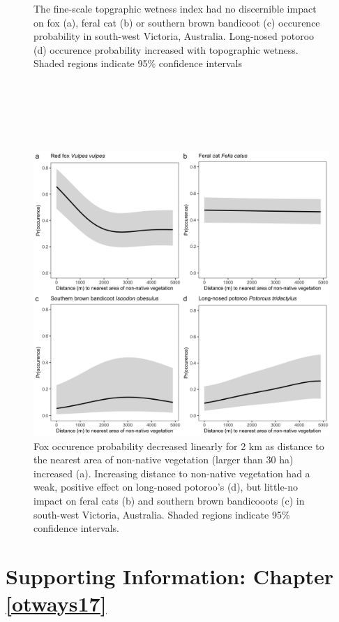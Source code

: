 \documentclass[11pt,a4paper,titlepage,twoside,openright]{style/unimelbthesis}
\begin{document}
\begin{mainmatter}
\begin{figure}
{}

\caption{The fine-scale topgraphic wetness index had no discernible impact on fox (a), feral cat (b) or southern brown bandicoot (c) occurence probability in south-west Victoria, Australia. Long-nosed potoroo (d) occurence probability increased with topographic wetness. Shaded regions indicate 95\% confidence intervals}\label{fig:occ-twi}
\end{figure}
\newpage

\(~\)

\(~\)

\(~\)
\begin{figure}

{\centering \includegraphics[width=1\linewidth]{figure/c1/dist_edge} 

}

\caption{Fox occurence probability decreased linearly for 2 km as distance to the nearest area of non-native vegetation (larger than 30 ha) increased (a). Increasing distance to non-native vegetation had a weak, positive effect on long-nosed potoroo's (d), but little-no impact on feral cats (b) and southern brown bandicooots (c) in south-west Victoria, Australia. Shaded regions indicate 95\% confidence intervals.}\label{fig:occ-dist}
\end{figure}
\newpage

\hypertarget{otways17-app}{%
\chapter{Supporting Information: Chapter \ref{otways17}}\label{otways17-app}}


\end{mainmatter}
\end{document}
